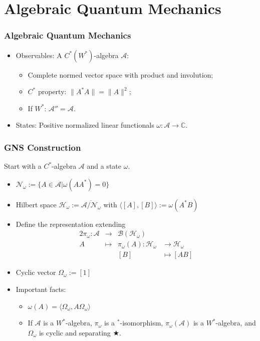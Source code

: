 \documentclass{beamer}
\begin{document}
\section{Algebraic Quantum Mechanics}

\begin{frame}
	\frametitle{Algebraic Quantum Mechanics}
	\begin{itemize}
		\item Observables: A $C^*(W^*)$-algebra $\mathcal{A}$:
		\begin{itemize}
			\item Complete normed vector space with product and involution;
			\item $C^*$ property: $\|A^*A\|=\|A\|^2$;
			\item If $W^*$: $\mathcal{A}''=\mathcal{A}$.
		\end{itemize}
		\vspace{1cm}
		\item States: Positive normalized linear functionals $\omega:\mathcal{A}\rightarrow\mathbb{C}$.
	\end{itemize}
\end{frame}

\begin{frame}
	\frametitle{GNS Construction}
	Start with a $C^*$-algebra $\mathcal{A}$ and a state $\omega$.
	\begin{itemize}
		\item $\mathcal{N}_\omega:=\{A\in\mathcal{A}|\omega(AA^*)=0\}$
		\item Hilbert space $\mathcal{H}_\omega := \overline{\mathcal{A}/\mathcal{N}_\omega}$ with $\langle [A], [B]\rangle := \omega(A^*B)$ 
		\item Define the representation extending
		\begin{alignat*}{2}
			\pi_\omega:\mathcal{A} & \rightarrow &\mathcal{B}(\mathcal{H}_\omega) \\
			A & \mapsto & \pi_\omega(A):\mathcal{H}_\omega & \rightarrow\mathcal{H}_\omega \\
			&& [B] & \mapsto [AB]
		\end{alignat*}
		\item Cyclic vector $\Omega_\omega := [1]$
		\item Important facts:
		\begin{itemize}
			\item $\omega(A)=\langle \Omega_\omega, A\Omega_\omega\rangle$
			\item If $\mathcal{A}$ is a $W^*$-algebra, $\pi_\omega$ is a $^*$-isomorphism, $\pi_\omega(\mathcal{A})$ is a $W^*$-algebra, and $\Omega_\omega$ is cyclic and separating $\bigstar$.
		\end{itemize}
	\end{itemize}
\end{frame}
\end{document}
